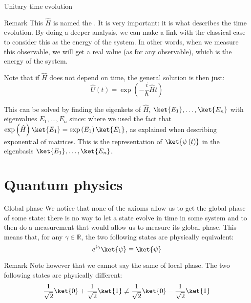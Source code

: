 \documentclass[a4paper]{article}
\begin{document}
\begin{parag}{Unitary time evolution}
\begin{subparag}{Remark}
        This $\hat{H}$ is named the . It is very important: it is what describes the time evolution. By doing a deeper analysis, we can make a link with the classical case to consider this as the energy of the system. In other words, when we measure this observable, we will get a real value (as for any observable), which is the energy of the system.

        Note that if $\hat{H}$ does not depend on time, the general solution is then just: 
        \[\hat{U}\left(t\right) = \exp\left(-\frac{i}{\hbar} \hat{H}t\right)\]

        This can be solved by finding the eigenkets of $\hat{H}$, $\ket{E_1}, \ldots, \ket{E_n}$ with eigenvalues $E_1, \ldots, E_n$ since: 
        where we used the fact that $\exp\left(\hat{H}\right) \ket{E_1} = \exp\left(E_1\right) \ket{E_1}$, as explained when describing exponential of matrices. This is the representation of $\ket{\psi\left(t\right)}$ in the eigenbasis $\ket{E_1}, \ldots, \ket{E_n}$.
    \end{subparag}
\end{parag}

\section{Quantum physics}

\begin{parag}{Global phase}
    We notice that none of the axioms allow us to get the global phase of some state: there is no way to let a state evolve in time in some system and to then do a measurement that would allow us to measure its global phase. This means that, for any $\gamma \in \mathbb{R}$, the two following states are physically equivalent: 
    \[e^{i \gamma} \ket{\psi} \equiv \ket{\psi}\]

    \begin{subparag}{Remark}
        Note however that we cannot say the same of local phase. The two following states are physically different: 
        \[\frac{1}{\sqrt{2}}\ket{0} + \frac{1}{\sqrt{2}}\ket{1} \not\equiv \frac{1}{\sqrt{2}}\ket{0} - \frac{1}{\sqrt{2}}\ket{1}\]
    \end{subparag}
\end{parag}
\end{document}
